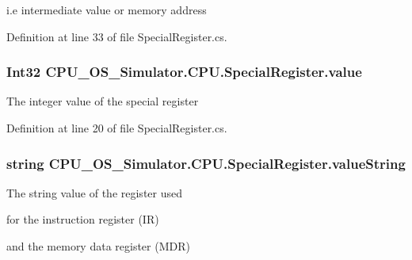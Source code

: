 i.\+e intermediate value or memory address 



Definition at line 33 of file Special\+Register.\+cs.

\hypertarget{class_c_p_u___o_s___simulator_1_1_c_p_u_1_1_special_register_a90d144e675bb3fe7bbc1f75bafdfde36}{}
\subsubsection[{value}]{\setlength{\rightskip}{0pt plus 5cm}Int32 C\+P\+U\+\_\+\+O\+S\+\_\+\+Simulator.\+C\+P\+U.\+Special\+Register.\+value\hspace{0.3cm}{\ttfamily [private]}}\label{class_c_p_u___o_s___simulator_1_1_c_p_u_1_1_special_register_a90d144e675bb3fe7bbc1f75bafdfde36}


The integer value of the special register 



Definition at line 20 of file Special\+Register.\+cs.

\hypertarget{class_c_p_u___o_s___simulator_1_1_c_p_u_1_1_special_register_a540a55b17a53591312e76689d051abac}{}
\subsubsection[{value\+String}]{\setlength{\rightskip}{0pt plus 5cm}string C\+P\+U\+\_\+\+O\+S\+\_\+\+Simulator.\+C\+P\+U.\+Special\+Register.\+value\+String\hspace{0.3cm}{\ttfamily [private]}}\label{class_c_p_u___o_s___simulator_1_1_c_p_u_1_1_special_register_a540a55b17a53591312e76689d051abac}


The string value of the register used 

for the instruction register (I\+R) 

and the memory data register (M\+D\+R) 




